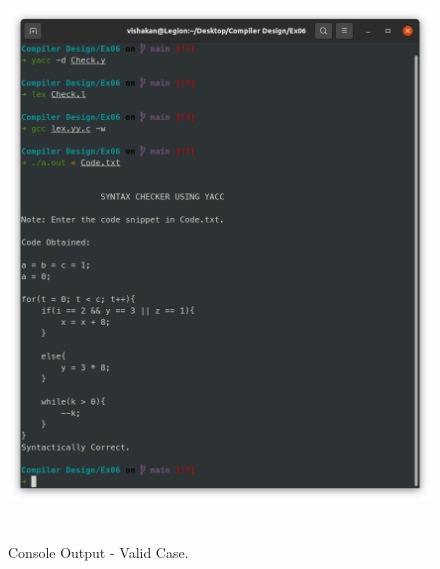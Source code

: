 \documentclass[12pt, a4]{article}
\begin{document}
\newpage
\subsection*{}
\begin{figure}[h]
\centering
\caption{Console Output - Valid Case.}
\includegraphics[height=15cm, width=15cm]{Output1.png}
\end{figure}

\newpage
\end{document}
